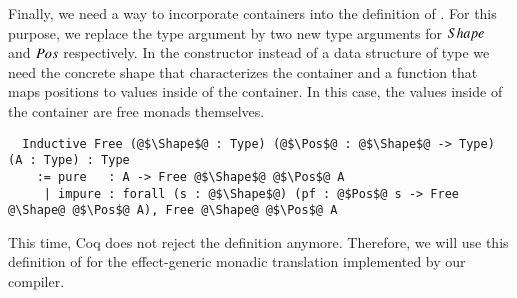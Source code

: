 Finally, we need a way to incorporate containers into the definition of .
For this purpose, we replace the type argument  by two new type arguments for $Shape$ and $Pos$ respectively.
In the  constructor instead of a data structure of type  we need the concrete shape  that characterizes the container and a function  that maps positions to values inside of the container.
In this case, the values inside of the container are free monads themselves.
\begin{verbatim}
  Inductive Free (@$\Shape$@ : Type) (@$\Pos$@ : @$\Shape$@ -> Type) (A : Type) : Type
    := pure   : A -> Free @$\Shape$@ @$\Pos$@ A
     | impure : forall (s : @$\Shape$@) (pf : @$Pos$@ s -> Free @\Shape@ @$\Pos$@ A), Free @\Shape@ @$\Pos$@ A
\end{verbatim}
This time, Coq does not reject the definition anymore.
Therefore, we will use this definition of  for the effect-generic monadic translation implemented by our compiler.
